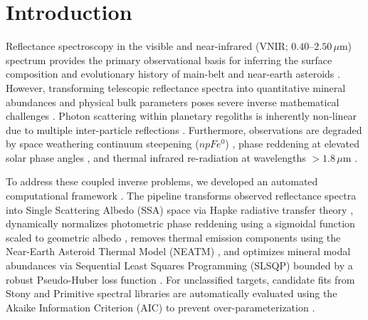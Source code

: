\documentclass[11pt,a4paper]{article}
\begin{document}
\newpage

\section{Introduction}
Reflectance spectroscopy in the visible and near-infrared (VNIR; $0.40$--$2.50\,\mu\text{m}$) spectrum provides the primary observational basis for inferring the surface composition and evolutionary history of main-belt and near-earth asteroids \cite{DeMeo2009, Gaffey1993}. However, transforming telescopic reflectance spectra into quantitative mineral abundances and physical bulk parameters poses severe inverse mathematical challenges \cite{Tarantola2005, Hapke1981}. Photon scattering within planetary regoliths is inherently non-linear due to multiple inter-particle reflections \cite{Hapke1981, Hapke2012}. Furthermore, observations are degraded by space weathering continuum steepening ($npFe^0$) \cite{Hapke2001, Pieters2000}, phase reddening at elevated solar phase angles \cite{Sanchez2012, Fornasier2015}, and thermal infrared re-radiation at wavelengths $> 1.8\,\mu\text{m}$ \cite{Harris1998}.

To address these coupled inverse problems, we developed an automated computational framework \cite{Tarantola2005, Hapke1981, Consolmagno2008, Carry2012}. The pipeline transforms observed reflectance spectra into Single Scattering Albedo (SSA) space via Hapke radiative transfer theory \cite{Hapke1981, Hapke2012}, dynamically normalizes photometric phase reddening using a sigmoidal function scaled to geometric albedo \cite{Sanchez2012, Fornasier2015}, removes thermal emission components using the Near-Earth Asteroid Thermal Model (NEATM) \cite{Harris1998}, and optimizes mineral modal abundances via Sequential Least Squares Programming (SLSQP) bounded by a robust Pseudo-Huber loss function \cite{Lawson1995, Huber1964, Bioucas2012}. For unclassified targets, candidate fits from Stony and Primitive spectral libraries are automatically evaluated using the Akaike Information Criterion (AIC) to prevent over-parameterization \cite{Akaike1974}.
\end{document}

